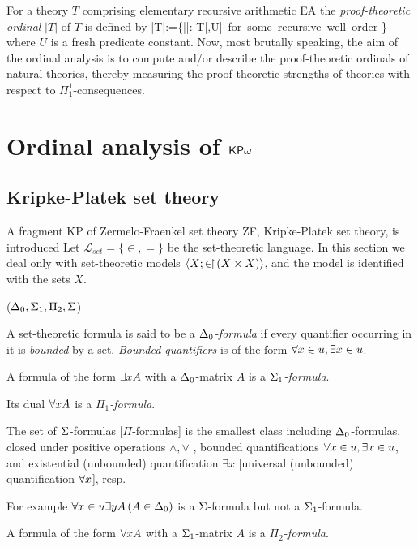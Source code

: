 \documentclass{article}
\begin{document}
\bdf\label{df:prfthordinal}
{\rm
For a theory $T$ comprising elementary recursive arithmetic {\sf EA}
the \textit{proof-theoretic ordinal} 
$|T|$
of $T$ is defined by
\beqn\label{eq:prfthordinal}
|T|:=\sup\{|\!\prec \!|: T[\prec,U]\, \mbox{for some recursive well order}
\prec\}
\eeqn
where $U$ is a fresh predicate constant.
}
\edf
Now, most brutally speaking, the aim of the ordinal analysis is to compute and/or describe the proof-theoretic ordinals of 
natural theories, thereby measuring the proof-theoretic strengths of theories with respect to
$\Pi^{1}_{1}$-consequences.


\section{Ordinal analysis of ${\sf KP}\omega$}

\subsection{Kripke-Platek set theory}\label{sect:KP}
A fragment {\sf KP} of Zermelo-Fraenkel set theory {\sf ZF}, Kripke-Platek set theory, is
introduced
Let $\mathcal{L}_{set}=\{\in,=\}$ be the set-theoretic language.
In this section we deal only with set-theoretic models $\langle X;\in\!\upharpoonright\!(X\times X)\rangle$, 
and the model is identified with the sets $X$.

\bdf\label{df:delfml}{\rm (}$\Delta_{0}, \Sigma_{1}, \Pi_{2}, \Sigma${\rm )}
\benu
\item
{\rm 
A set-theoretic formula is said to be a
\textit{$\Delta_{0}$-formula}
if every quantifier occurring in it is \textit{bounded} by a set.
\textit{Bounded quantifiers} is of the form $\forall x\in u, \exists x\in u$.
}

\item 
{\rm 
A formula of the form $\exi x A$ with a $\Delta_{0}$-matrix $A$ is a
\textit{$\Sigma_{1}$-formula}.

Its dual $\forall x A$ is a \textit{$\Pi_{1}$-formula}.
}
\item
{\rm 
The set of $\Sigma$-formulas [$\Pi$-formulas] is the smallest class including $\Delta_{0}$-formulas, closed under
positive operations $\land, \lor$ , bounded quantifications $\forall x\in u, \exists x\in u$, and
existential (unbounded) quantification $\exi x$ [universal (unbounded) quantification $\forall x$], resp.

For example $\forall x\in u\exists y A\, (A\in\Delta_{0})$ is a $\Sigma$-formula  but not a $\Sigma_{1}$-formula.
}
\item 
{\rm 
A formula of the form $\forall x A$ with a $\Sigma_{1}$-matrix $A$ is a
\textit{$\Pi_{2}$-formula}.
}
\eenu
\edf
\end{document}
